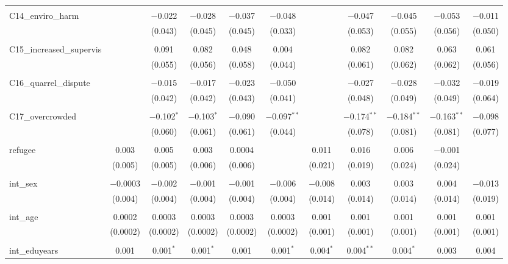 \begin{table}[H]
\begin{tabular}{@{\extracolsep{4pt}}lcccccccccc}
  & & & & & & & & & & \\ 
 C14\_enviro\_harm &  & $-$0.022 & $-$0.028 & $-$0.037 & $-$0.048 &  & $-$0.047 & $-$0.045 & $-$0.053 & $-$0.011 \\ 
  &  & (0.043) & (0.045) & (0.045) & (0.033) &  & (0.053) & (0.055) & (0.056) & (0.050) \\ 
  & & & & & & & & & & \\ 
 C15\_increased\_supervis &  & 0.091 & 0.082 & 0.048 & 0.004 &  & 0.082 & 0.082 & 0.063 & 0.061 \\ 
  &  & (0.055) & (0.056) & (0.058) & (0.044) &  & (0.061) & (0.062) & (0.062) & (0.056) \\ 
  & & & & & & & & & & \\ 
 C16\_quarrel\_dispute &  & $-$0.015 & $-$0.017 & $-$0.023 & $-$0.050 &  & $-$0.027 & $-$0.028 & $-$0.032 & $-$0.019 \\ 
  &  & (0.042) & (0.042) & (0.043) & (0.041) &  & (0.048) & (0.049) & (0.049) & (0.064) \\ 
  & & & & & & & & & & \\ 
 C17\_overcrowded &  & $-$0.102$^{*}$ & $-$0.103$^{*}$ & $-$0.090 & $-$0.097$^{**}$ &  & $-$0.174$^{**}$ & $-$0.184$^{**}$ & $-$0.163$^{**}$ & $-$0.098 \\ 
  &  & (0.060) & (0.061) & (0.061) & (0.044) &  & (0.078) & (0.081) & (0.081) & (0.077) \\ 
  & & & & & & & & & & \\ 
 refugee & 0.003 & 0.005 & 0.003 & 0.0004 &  & 0.011 & 0.016 & 0.006 & $-$0.001 &  \\ 
  & (0.005) & (0.005) & (0.006) & (0.006) &  & (0.021) & (0.019) & (0.024) & (0.024) &  \\ 
  & & & & & & & & & & \\ 
 int\_sex & $-$0.0003 & $-$0.002 & $-$0.001 & $-$0.001 & $-$0.006 & $-$0.008 & 0.003 & 0.003 & 0.004 & $-$0.013 \\ 
  & (0.004) & (0.004) & (0.004) & (0.004) & (0.004) & (0.014) & (0.014) & (0.014) & (0.014) & (0.019) \\ 
  & & & & & & & & & & \\ 
 int\_age & 0.0002 & 0.0003 & 0.0003 & 0.0003 & 0.0003 & 0.001 & 0.001 & 0.001 & 0.001 & 0.001 \\ 
  & (0.0002) & (0.0002) & (0.0002) & (0.0002) & (0.0002) & (0.001) & (0.001) & (0.001) & (0.001) & (0.001) \\ 
  & & & & & & & & & & \\ 
 int\_eduyears & 0.001 & 0.001$^{*}$ & 0.001$^{*}$ & 0.001 & 0.001$^{*}$ & 0.004$^{*}$ & 0.004$^{**}$ & 0.004$^{*}$ & 0.003 & 0.004 \\ 

\end{tabular}
\end{table}
